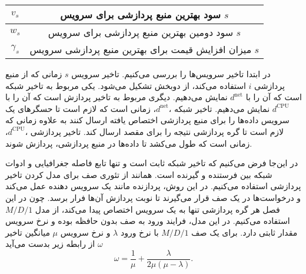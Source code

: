 \begin{table}[h]
\begin{tabularx}{\textwidth}{|c|C|}
        $v_s$               & سود بهترین منبع پردازشی برای سرویس $s$                                                     \\ \hline
        $w_s$               & سود دومین بهترین منبع پردازشی برای سرویس $s$                                               \\ \hline
        $\gamma_s$          & میزان افزایش قیمت برای بهترین منبع پردازشی سرویس $s$                                       \\ \hline
      \end{tabularx}
      \label{tbl:one_to_one:notation}
    \end{table}

    در ابتدا تاخیر سرویس‌ها را بررسی می‌کنیم.
    تاخیر سرویس $s$ زمانی که از منبع پردازشی $i$ استفاده می‌کند، از دوبخش تشکیل می‌شود.
    یکی مربوط به تاخیر شبکه‌ است که آن را با $d^\text{net}$ نمایش می‌دهیم.
    دیگری مربوط به تاخیر پردازش است که آن را با $d^\text{CPU}$ نمایش می‌دهیم.
    تاخیر شبکه ،$d^\text{net}$، زمانی است که لازم است تا حسگر‌‌های یک سرویس داده‌ها را برای منبع پردازشی اختصاص یافته ارسال کنند به علاوه زمانی که لازم است تا گره پردازشی نتیجه را برای مقصد ارسال کند.
    تاخیر پردازشی ،$d^\text{CPU}$، زمانی است که طول می‌کشد تا داده‌ها در منبع پردازشی، پردازش شوند.
    
    در این‌جا فرض می‌کنیم که تاخیر شبکه ثابت است و تنها تابع فاصله جغرافیایی و ادوات شبکه بین فرستنده و گیرنده است.
    همانند \cite{optimial_price_cloud_valerio} از تئوری صف برای مدل کردن تاخیر پردازشی استفاده می‌کنیم.
    در این روش، پردازنده مانند یک سرویس دهنده عمل می‌کند و درخواست‌ها در یک صف قرار می‌گیرند تا نوبت پردازش آن‌ها فرار برسد.
    چون در این فصل هر گره پردازشی تنها به یک سرویس اختصاص پیدا می‌کند، از مدل $M/D/1$ استفاده می‌کنیم.
    در این مدل، فرایند ورود به صف بدون حافظه بوده و نرخ سرویس‌ مقدار ثابتی دارد.
    برای یک صف $M/D/1$ با نرخ ورود $\lambda$ و نرخ سرویس  $\mu$ میانگین تاخیر $\omega$ از رابطه زیر بدست می‌آید\cite{basic_queueing_sztrik}
    \begin{equation}\label{eqn:md1_queue_responsetime}
      \omega = \frac{1}{\mu} + \frac{\lambda}{2\mu(\mu-\lambda)}.
    \end{equation}
    
